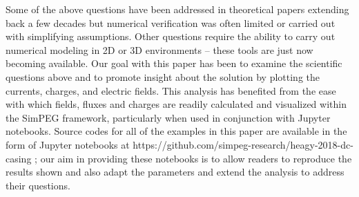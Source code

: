 Some of the above questions have been addressed in theoretical papers extending back a few decades but numerical verification was often limited or carried out with simplifying assumptions. Other questions require the ability to carry out numerical modeling in 2D or 3D environments -- these tools are just now becoming available. Our goal with this paper has been to examine the scientific questions above and to promote insight about the solution by plotting the currents, charges, and electric fields. This analysis has benefited from the ease with which fields, fluxes and charges are readily calculated and visualized within the SimPEG framework, particularly when used in conjunction with Jupyter notebooks. Source codes for all of the examples in this paper are available in the form of Jupyter notebooks at https://github.com/simpeg-research/heagy-2018-dc-casing \citep{Heagy2018b}; our aim in providing these notebooks is to allow readers to reproduce the results shown and also adapt the parameters and extend the analysis to address their questions.

